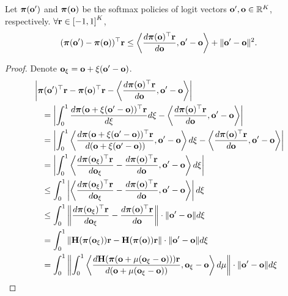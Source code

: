 \begin{lem}
\label{lem:logit_smoothness}
Let ${\boldsymbol{\pi}}({\mathbf{o}}^\prime)$ and ${\boldsymbol{\pi}}( {\mathbf{o}})$ be the softmax policies of logit vectors ${\mathbf{o}}^\prime, {\mathbf{o}} \in {\mathbb{R}}^K$, respectively. $\forall {\mathbf{r}} \in \left[ -1, 1\right]^K$,
\begin{equation*}
    ( {\boldsymbol{\pi}}({\mathbf{o}}^\prime) - {\boldsymbol{\pi}}({\mathbf{o}})) ^\top {\mathbf{r}} \le \left\langle \frac{d {\boldsymbol{\pi}}({\mathbf{o}})^\top {\mathbf{r}}}{d {\mathbf{o}}}, {\mathbf{o}}^\prime - {\mathbf{o}} \right\rangle + \| {\mathbf{o}}^\prime - {\mathbf{o}} \|^2.
\end{equation*}
\end{lem}
\begin{proof}
Denote ${\mathbf{o}}_{\xi} = {\mathbf{o}} + \xi ( {\mathbf{o}}^\prime - {\mathbf{o}} )$.
\begin{equation*}
\begin{split}
    &\left| \rvpi( \rvo^\prime )^\top \rvr - \rvpi( \rvo )^\top \rvr - \left\langle \frac{d \rvpi( \rvo )^\top \rvr}{d \rvo}, \rvo^\prime - \rvo \right\rangle \right| \\
    &\quad = \left| \int_0^1{ \frac{d \rvpi( \rvo + \xi ( \rvo^\prime - \rvo ) )^\top \rvr}{d \xi} d\xi} - \left\langle \frac{d \rvpi( \rvo )^\top \rvr}{d \rvo}, \rvo^\prime - \rvo \right\rangle \right| \\
    &\quad = \left| \int_0^1{ \left\langle \frac{d \rvpi( \rvo + \xi ( \rvo^\prime - \rvo ) )^\top \rvr}{d ( \rvo + \xi ( \rvo^\prime - \rvo ) )}, \rvo^\prime - \rvo \right\rangle d\xi} - \left\langle \frac{d \rvpi( \rvo )^\top \rvr}{d \rvo}, \rvo^\prime - \rvo \right\rangle \right| \\
    &\quad = \left| \int_0^1{ \left\langle \frac{d \rvpi( \rvo_{\xi} )^\top \rvr}{d \rvo_{\xi}} - \frac{d \rvpi( \rvo )^\top \rvr}{d \rvo}, \rvo^\prime - \rvo \right\rangle d\xi} \right| \\
    &\quad \le \int_0^1{ \left| \left\langle \frac{d \rvpi( \rvo_{\xi} )^\top \rvr}{d \rvo_{\xi}} - \frac{d \rvpi( \rvo )^\top \rvr}{d \rvo}, \rvo^\prime - \rvo \right\rangle \right| d\xi} \\
    &\quad \le \int_0^1{ \left\| \frac{d \rvpi( \rvo_{\xi} )^\top \rvr}{d \rvo_{\xi}} - \frac{d \rvpi( \rvo )^\top \rvr}{d \rvo} \right\| \cdot \| \rvo^\prime - \rvo \| d\xi} \\
    &\quad = \int_0^1{ \| \rmH( \rvpi( \rvo_{\xi} )) \rvr - \rmH( \rvpi( \rvo )) \rvr \| \cdot \| \rvo^\prime - \rvo \| d\xi} \\
    &\quad = \int_0^1{ \left\| \int_0^1{\left\langle \frac{d \rmH ( \rvpi( \rvo + \mu( \rvo_{\xi} - \rvo ) ) ) \rvr }{d ( \rvo + \mu( \rvo_{\xi} - \rvo ) )}, \rvo_{\xi} - \rvo \right\rangle d\mu} \right\| \cdot \| \rvo^\prime - \rvo \| d\xi} \\

\end{split}
\end{equation*}
\end{proof}
